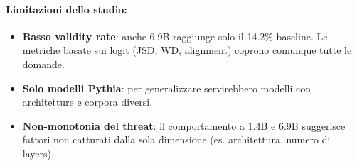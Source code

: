 \documentclass[../relazione.tex]{subfiles}
\begin{document}
\paragraph{Limitazioni dello studio:}
\begin{itemize}
    \item \textbf{Basso validity rate}: anche 6.9B raggiunge solo il 14.2\% baseline. Le metriche basate sui logit (JSD, WD, alignment) coprono comunque tutte le domande.
    \item \textbf{Solo modelli Pythia}: per generalizzare servirebbero modelli con architetture e corpora diversi.
    \item \textbf{Non-monotonia del threat}: il comportamento a 1.4B e 6.9B suggerisce fattori non catturati dalla sola dimensione (es. architettura, numero di layers).
\end{itemize}
\end{document}
